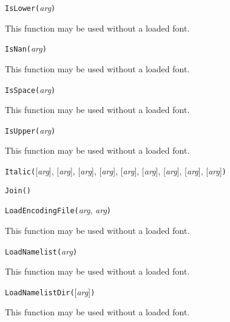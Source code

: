 \texttt{IsLower(}\textit{arg}\texttt{)}

This function may be used without a loaded font.



\texttt{IsNan(}\textit{arg}\texttt{)}

This function may be used without a loaded font.



\texttt{IsSpace(}\textit{arg}\texttt{)}

This function may be used without a loaded font.



\texttt{IsUpper(}\textit{arg}\texttt{)}

This function may be used without a loaded font.



\texttt{Italic(}[\textit{arg}], [\textit{arg}], [\textit{arg}], [\textit{arg}], [\textit{arg}], [\textit{arg}], [\textit{arg}], [\textit{arg}], [\textit{arg}]\texttt{)}



\texttt{Join(}\texttt{)}



\texttt{LoadEncodingFile(}\textit{arg}, \textit{arg}\texttt{)}

This function may be used without a loaded font.



\texttt{LoadNamelist(}\textit{arg}\texttt{)}

This function may be used without a loaded font.



\texttt{LoadNamelistDir(}[\textit{arg}]\texttt{)}

This function may be used without a loaded font.

